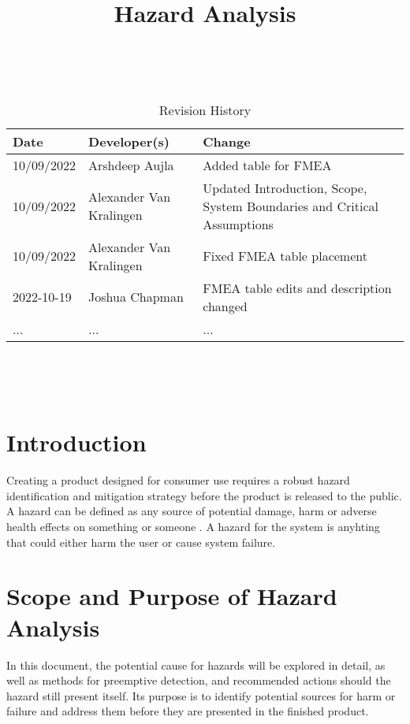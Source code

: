 \documentclass{article}
\title{Hazard Analysis\\\progname}
\author{\authname}
\date{}
\begin{document}
\maketitle
\thispagestyle{empty}

~\newpage


\begin{table}[hp]
\caption{Revision History} \label{TblRevisionHistory}
\begin{tabularx}{\textwidth}{llX}
\toprule
\textbf{Date} & \textbf{Developer(s)} & \textbf{Change}\\
\midrule
10/09/2022 & Arshdeep Aujla & Added table for FMEA\\
10/09/2022 & Alexander Van Kralingen & Updated Introduction, Scope, System Boundaries and Critical Assumptions\\
10/09/2022 & Alexander Van Kralingen & Fixed FMEA table placement\\
2022-10-19 & Joshua Chapman & FMEA table edits and description changed\\
... & ... & ...\\
\bottomrule
\end{tabularx}
\end{table}

~\newpage

\tableofcontents

~\newpage



\section{Introduction}{
    Creating a product designed for consumer use requires a robust hazard identification and mitigation strategy before the product is released to the public. A hazard can be defined as any source of potential damage, harm or adverse health effects on something or someone \cite{CCOHS}. A hazard for the \progname{} system is anyhting that could either harm the user or cause system failure.
}

\section{Scope and Purpose of Hazard Analysis}{
    In this document, the potential cause for hazards will be explored in detail, as well as methods for preemptive detection, and recommended actions should the hazard still present itself. Its purpose is to identify potential sources for harm or failure and address them before they are presented in the finished product.
}
\end{document}
